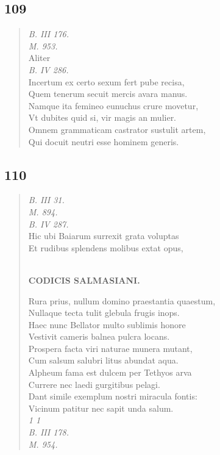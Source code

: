 \documentclass[11pt, a4paper]{report}
\begin{document}
            \subsection*{109}
      \begin{verse}
      \textit{B. III 176.} \\ \textit{M. 953.} \\ Aliter \\ \textit{B. IV 286.} \\ Incertum ex certo sexum fert pube recisa, \\ Quem tenerum secuit mercis avara manus. \\ Namque ita femineo eunuchus crure movetur, \\ Vt dubites quid si, vir  \lbrack magis \rbrack  an mulier. \\ Omnem grammaticam castrator sustulit artem, \\ Qui docuit neutri esse hominem generis. \\ 
      \end{verse}
  
            \subsection*{110}
      \begin{verse}
      \textit{B. III 31.} \\ \textit{M. 894.} \\ \textit{B. IV 287.} \\ Hic ubi Baiarum surrexit grata voluptas \\ Et rudibus splendens molibus extat opus, \\ 
        ﻿\pagebreak 
    \begin{center} \textbf{CODICIS SALMASIANI.} \end{center} \marginpar{[129]} Rura prius, nullum domino praestantia quaestum, \\ Nullaque tecta tulit glebula frugis inops. \\ Haec nunc Bellator multo sublimis honore \\ Vestivit cameris balnea pulcra locans. \\ Prospera facta viri naturae munera mutant, \\ Cum salsum salubri litus abundat aqua. \\ Alpheum fama est dulcem per Tethyos arva \\ Currere nec laedi gurgitibus pelagi. \\ Dant simile exemplum nostri miracula fontis: \\ Vicinum patitur nec sapit unda salum. \\ \textit{1 1} \\ \textit{B. III 178.} \\ \textit{M. 954.} \\ 
      \end{verse}
  
\end{document}
